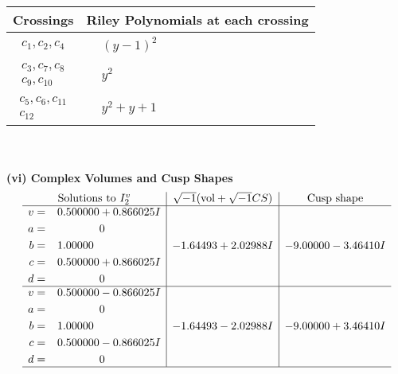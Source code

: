 \documentclass[1p]{elsarticle_modified}
\theoremstyle{definition}
\newcommand{\I}{\sqrt{-1}}
\begin{document}
\begin{tabular}{m{50pt}|m{274pt}}
Crossings & \hspace{64pt}Riley Polynomials at each crossing \\
\hline $$\begin{aligned}c_{1},c_{2},c_{4}\end{aligned}$$&$\begin{aligned}
&(y-1)^2
\end{aligned}$\\
\hline $$\begin{aligned}c_{3},c_{7},c_{8}\\c_{9},c_{10}\end{aligned}$$&$\begin{aligned}
&y^2
\end{aligned}$\\
\hline $$\begin{aligned}c_{5},c_{6},c_{11}\\c_{12}\end{aligned}$$&$\begin{aligned}
&y^2+y+1
\end{aligned}$\\
\hline
\end{tabular}\\~\\
\newpage\flushleft \textbf{(vi) Complex Volumes and Cusp Shapes}
$$\begin{array}{c|c|c}  
\text{Solutions to }I^v_{2}& \I (\text{vol} + \sqrt{-1}CS) & \text{Cusp shape}\\
 \hline 
\begin{aligned}
v &= \phantom{-}0.500000 + 0.866025 I \\
a &= \phantom{-0.000000 } 0 \\
b &= \phantom{-}1.00000\phantom{ +0.000000I} \\
c &= \phantom{-}0.500000 + 0.866025 I \\
d &= \phantom{-0.000000 } 0\end{aligned}
 & -1.64493 + 2.02988 I & -9.00000 - 3.46410 I \\ \hline\begin{aligned}
v &= \phantom{-}0.500000 - 0.866025 I \\
a &= \phantom{-0.000000 } 0 \\
b &= \phantom{-}1.00000\phantom{ +0.000000I} \\
c &= \phantom{-}0.500000 - 0.866025 I \\
d &= \phantom{-0.000000 } 0\end{aligned}
 & -1.64493 - 2.02988 I & -9.00000 + 3.46410 I\\
 \hline 
 \end{array}$$\newpage\newpage\renewcommand{\arraystretch}{1}
\end{document}
